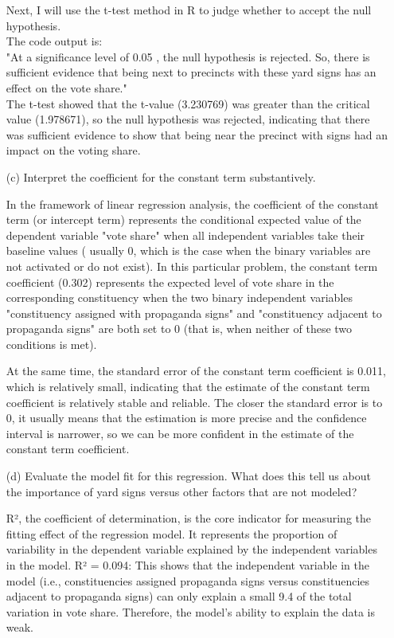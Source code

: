 \documentclass[12pt,letterpaper]{article}
\begin{document}
\begin{enumerate}
	Next, I will use the t-test method in R to judge whether to accept the null hypothesis.\\
	
	
	The code output is:\\
	
	"At a significance level of  0.05 , the null hypothesis is rejected. So, there is sufficient evidence that being next to precincts with these yard signs has an effect on the vote share."\\
	
	The t-test showed that the t-value (3.230769) was greater than the critical value (1.978671), so the null hypothesis was rejected, indicating that there was sufficient evidence to show that being near the precinct with signs had an impact on the voting share.\\

	\item [(c)] Interpret the coefficient for the constant term substantively.

In the framework of linear regression analysis, the coefficient of the constant term (or intercept term) represents the conditional expected value of the dependent variable "vote share" when all independent variables take their baseline values ( usually 0, which is the case when the binary variables are not activated or do not exist). In this particular problem, the constant term coefficient (0.302) represents the expected level of vote share in the corresponding constituency when the two binary independent variables "constituency assigned with propaganda signs" and "constituency adjacent to propaganda signs" are both set to 0 (that is, when neither of these two conditions is met).

At the same time, the standard error of the constant term coefficient is 0.011, which is relatively small, indicating that the estimate of the constant term coefficient is relatively stable and reliable. The closer the standard error is to 0, it usually means that the estimation is more precise and the confidence interval is narrower, so we can be more confident in the estimate of the constant term coefficient.\\

	\item [(d)] Evaluate the model fit for this regression.  What does this	tell us about the importance of yard signs versus other factors that are not modeled?
	
R², the coefficient of determination, is the core indicator for measuring the fitting effect of the regression model. It represents the proportion of variability in the dependent variable explained by the independent variables in the model. R² = 0.094: This shows that the independent variable in the model (i.e., constituencies assigned propaganda signs versus constituencies adjacent to propaganda signs) can only explain a small 9.4 of the total variation in vote share. Therefore, the model's ability to explain the data is weak.\\


\end{enumerate}
\end{document}
